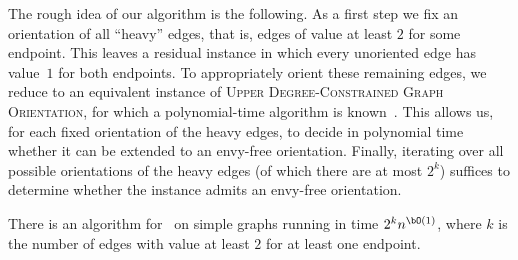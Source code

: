 \documentclass[11pt,letterpaper]{article}
\begin{document}
The rough idea of our algorithm is the following.
As a first step we fix an orientation of all ``heavy'' edges, that is, edges of value at least $2$ for some endpoint.
This leaves a residual instance in which every unoriented edge has value~$1$ for both endpoints.
To appropriately orient these remaining edges, we reduce to an equivalent instance of
\textsc{Upper Degree-Constrained Graph Orientation}, for which a polynomial-time algorithm is known~\cite{FrankGyarfas1978}.
This allows us, for each fixed orientation of the heavy edges, to decide in polynomial time
whether it can be extended to an envy-free orientation.
Finally, iterating over all possible orientations of the heavy edges (of which there are at most $2^k$)
suffices to determine whether the instance admits an envy-free orientation.

%

\begin{theoremrep}[\appsymb]\label{thm:EFo:Heavy}
    There is an algorithm
    for \EFo\ on simple graphs running in time $2^k n^{\bO(1)}$, where $k$ is the number of edges with value at least $2$ for at least one endpoint.
\end{theoremrep}
\end{document}
